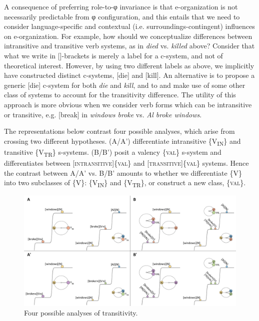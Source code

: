   A consequence of preferring role-to-φ invariance is that e-organization is not necessarily predictable from φ configuration, and this entails that we need to consider language-specific and contextual (i.e. surroundings-contingent) influences on e-organization. For example, how should we conceptualize differences between intransitive and transitive verb systems, as in \textit{died} vs. \textit{killed} above? Consider that what we write in []-brackets is merely a label for a c-system, and not of theoretical interest. However, by using two different labels as above, we implicitly have constructed distinct c-systems, [die] and [kill]. An alternative is to propose a generic [die] c-system for both \textit{die} and \textit{kill}, and to and make use of some other class of systems to account for the transitivity difference. The utility of this approach is more obvious when we consider verb forms which can be intransitive or transitive, e.g. [break] in \textit{windows broke} vs. \textit{Al broke windows}. 

  The representations below contrast four possible analyses, which arise from crossing two different hypotheses. (A/A') differentiate intransitive \{V\textsubscript{IN}\} and transitive \{V\textsubscript{TR}\} s-systems. (B/B') posit a valency \{\textsc{val}\} s-system and differentiates between [\textsc{intransitive}]\{\textsc{val}\} and [\textsc{transitive}]\{\textsc{val}\} systems. Hence the contrast between A/A' vs. B/B' amounts to whether we differentiate \{V\} into two subclasses of \{V\}: \{V\textsubscript{IN}\} and \{V\textsubscript{TR}\}, or construct a new class, \{\textsc{val}\}.

  
\begin{figure}
\includegraphics[width=\textwidth]{figures/Tilsen-img72.png}
\caption{Four possible analyses of transitivity.}
\label{fig:4:22}
\end{figure}
 

